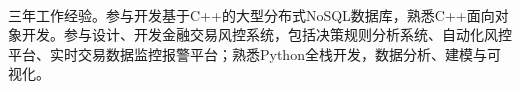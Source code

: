 \documentclass[11pt, a4paper, UTF8]{awesome-cv}
\begin{document}
\makecvheader[R]

\makecvfooter
  {\ }
  {\ }
  {\ }




\begin{cvparagraph}
三年工作经验。参与开发基于C++的大型分布式NoSQL数据库，熟悉C++面向对象开发。参与设计、开发金融交易风控系统，包括决策规则分析系统、自动化风控平台、实时交易数据监控报警平台；熟悉Python全栈开发，数据分析、建模与可视化。
\end{cvparagraph}
\end{document}
